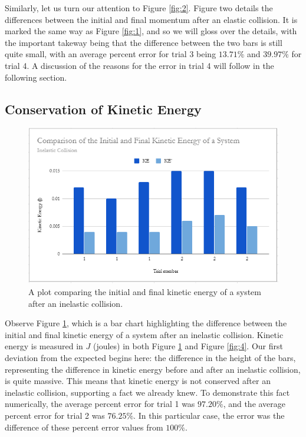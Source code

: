\documentclass{article}
\theoremstyle{definition}
\begin{document}
Similarly, let us turn our attention to Figure \ref{fig:2}. Figure two details the differences between the initial and final momentum
after an elastic collision. It is marked the same way as Figure \ref{fig:1}, and so we will gloss over the details, with the important
takeway being that the difference between the two bars is still quite small, with an average percent error for trial 3 being
$13.71\%$ and $39.97\%$ for trial 4. A discussion of the reasons for the error in trial 4 will follow in the following section. 
\subsection*{Conservation of Kinetic Energy}
\begin{figure}
    \includegraphics[width = 1 \columnwidth]{fig6.PNG}
    \caption{A plot comparing the initial and final kinetic energy of a system after an inelastic collision.}
    \label{fig:3}
\end{figure}
Observe Figure \ref{fig:3}, which is a bar chart highlighting the difference between the initial and final kinetic energy of a system after an 
inelastic collision. Kinetic energy is measured in $J$ (joules) in both Figure \ref{fig:3} and Figure \ref{fig:4}.
Our first deviation from the expected begins here: the difference in the height of the bars, representing the difference in kinetic energy before 
and after an inelastic collision, is quite massive. This means that kinetic energy is not conserved after an inelastic collision, supporting a fact we already knew.
To demonstrate this fact numerically, the average percent error for trial 1 was $97.20\%$, and the average percent error for trial 2 was
$76.25\%$. In this particular case, the error was the difference of these percent error values from $100\%$.
\end{document}
